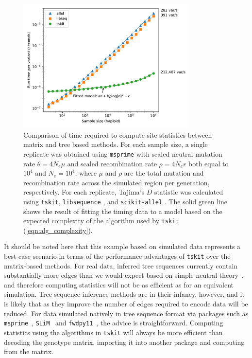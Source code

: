 \documentclass{article}
\newcommand{\tskit}{{\texttt{tskit}}}
\begin{document}
\begin{figure}
    \centering
    \includegraphics[width=9cm]{tskit_stat_benchmarks/benchmarks_without_copy_longer_genome.pdf}
    \caption{Comparison of time required to compute site statistics
        between matrix and tree based methods. For each sample size, a single replicate
        was obtained using \texttt{msprime} with scaled neutral mutation rate $\theta = 4N_e\mu$ and
        scaled recombination rate $\rho = 4N_er$ both equal to $10^4$ and $N_e = 10^4$,
        where $\mu$ and $\rho$ are the total mutation and recombination rate across the simulated region
        per generation, respectively.
        For each replicate, Tajima's $D$
        \citep{Tajima1989-de} statistic was calculated using \tskit, \texttt{libsequence}
        \citep{Thornton2003-wj}, and \texttt{scikit-allel} \citep{miles2017scikit}.
        The solid green line shows the result of fitting the timing data to a model based on the expected complexity of the algorithm used by \texttt{tskit}
        (\autoref{eqn:alg_complexity}).
        \label{fig:stats_performance}
    }
\end{figure}

It should be noted here that this example based on simulated data
represents a best-case scenario in terms of the performance advantages
of \tskit{} over the matrix-based methods. For real data, inferred
tree sequences currently contain substantially more edges than we
would expect based on simple neutral theory~\citep{kelleher2019inferring},
and therefore computing statistics will not be as efficient as
for an equivalent simulation. Tree sequence inference
methods are in their infancy, however, and it is likely that
as they improve the number of edges required to encode data will
be reduced. For data simulated natively in tree sequence format
via packages such as \texttt{msprime}~\citep{kelleher2016efficient},
\texttt{SLiM}~\citep{haller2018tree,haller2019slim} and
\texttt{fwdpy11}~\citep{thornton2014c++}, the advice is straightforward.
Computing statistics using the algorithms in \tskit{}
will always be more efficient than decoding the genotype
matrix, importing it into another package and computing from the matrix.
\end{document}
